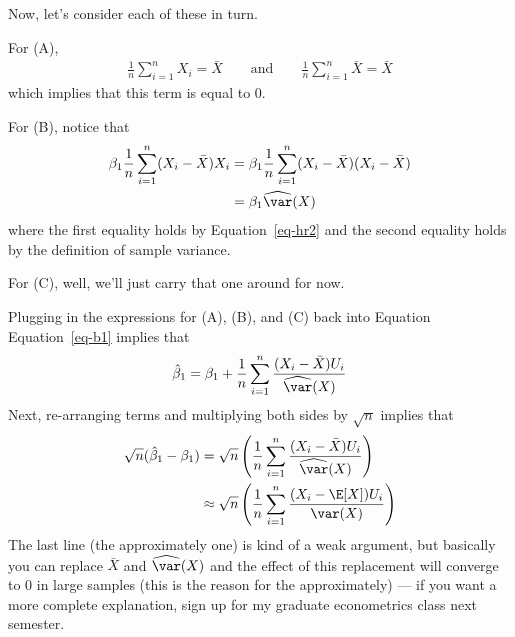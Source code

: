 \documentclass[
  letterpaper,
  DIV=11,
  numbers=noendperiod]{scrreprt}
\begin{document}
Now, let's consider each of these in turn.

For (A), \begin{align*}
  \frac{1}{n} \sum_{i=1}^n X_i = \bar{X} \qquad \textrm{and} \qquad \frac{1}{n} \sum_{i=1}^n \bar{X} = \bar{X}
\end{align*} which implies that this term is equal to 0.

For (B), notice that \begin{align*}
  \beta_1 \frac{1}{n} \sum_{i=1}^n (X_i - \bar{X}) X_i &= \beta_1 \frac{1}{n} \sum_{i=1}^n (X_i - \bar{X}) (X_i - \bar{X}) \\
  &= \beta_1 \widehat{\var}(X)
\end{align*} where the first equality holds by Equation~\ref{eq-hr2} and
the second equality holds by the definition of sample variance.

For (C), well, we'll just carry that one around for now.

Plugging in the expressions for (A), (B), and (C) back into Equation
Equation~\ref{eq-b1} implies that \begin{align*}
  \hat{\beta}_1 = \beta_1 + \frac{1}{n} \sum_{i=1}^n \frac{(X_i - \bar{X}) U_i}{\widehat{\var}(X)}
\end{align*} Next, re-arranging terms and multiplying both sides by
\(\sqrt{n}\) implies that \begin{align*}
  \sqrt{n}(\hat{\beta}_1 - \beta_1) &= \sqrt{n} \left(\frac{1}{n} \sum_{i=1}^n \frac{(X_i - \bar{X}) U_i}{\widehat{\var}(X)}\right) \\
  & \approx \sqrt{n} \left(\frac{1}{n} \sum_{i=1}^n \frac{(X_i - \E[X]) U_i}{\var(X)}\right)
\end{align*} The last line (the approximately one) is kind of a weak
argument, but basically you can replace \(\bar{X}\) and
\(\widehat{\var}(X)\) and the effect of this replacement will converge
to 0 in large samples (this is the reason for the approximately) --- if
you want a more complete explanation, sign up for my graduate
econometrics class next semester.
\end{document}
